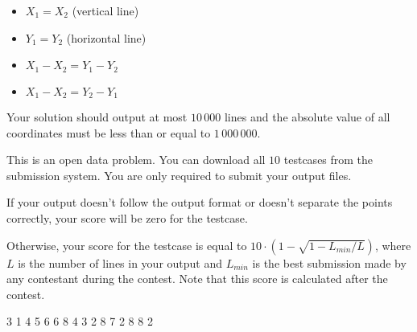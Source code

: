 \begin{itemize}
  \item $X_1 = X_2$ (vertical line)
  \item $Y_1 = Y_2$ (horizontal line)
  \item $X_1 - X_2 = Y_1 - Y_2$
  \item $X_1 - X_2 = Y_2 - Y_1$
\end{itemize}

Your solution should output at most $10\,000$ lines and the absolute value of all coordinates must be less than or equal to $1\,000\,000$.

This is an open data problem. You can download all $10$ testcases from the submission system. You are only required to submit your output files.

If your output doesn't follow the output format or doesn't separate the points correctly, your score will be zero for the testcase.

Otherwise, your score for the testcase is equal to
$ 10 \cdot \left(1 - \sqrt{1 - L_{min} / L}\right)$,
where $L$ is the number of lines in your output and $L_{min}$ is the best submission made by any contestant during the contest.
Note that this score is calculated after the contest.


3 1
4 5
6 6
8 4
3 2 8 7
2 8 8 2
\sampleEND


